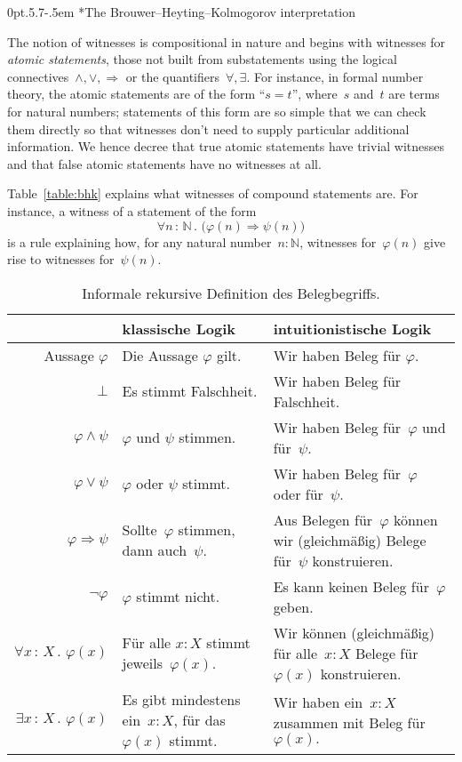 \documentclass[10pt,reqno,a4paper,openany]{amsbook}
\makeatletter
\theoremstyle{definition}
\theoremstyle{plain}
\theoremstyle{remark}
\newcommand{\NN}{\mathbb{N}}
\newcommand{\?}{\,{:}\,}
\renewcommand{\_}{\mathpunct{.}\,}
\def\subsection{\@startsection{subsection}{2}%
  {0pt}{.5\linespacing\@plus.7\linespacing}{-.5em}%
  {\normalfont\bfseries}}
\makeatother
\begin{document}
\subsection*{The Brouwer--Heyting--Kolmogorov interpretation}

The notion of witnesses is compositional in nature and begins with witnesses for \emph{atomic
statements}, those not built from substatements using the logical
connectives~$\wedge,\vee,\Rightarrow$ or the quantifiers~$\forall,\exists$. For
instance, in formal number theory, the atomic statements are of the form
``$s = t$'',
where~$s$ and~$t$ are terms for natural numbers; statements of this form are so
simple that we can check them directly so that witnesses don't need to supply
particular additional information. We hence decree that true atomic statements
have trivial witnesses and that false atomic statements have no witnesses at
all.

Table~\ref{table:bhk} explains what witnesses of compound statements are. For
instance, a witness of a statement of the form
\[ \forall n \? \NN\_ \bigl(\varphi(n) \Rightarrow \psi(n)\bigr) \]
is a rule explaining how, for any natural number~$n : \NN$, witnesses
for~$\varphi(n)$ give rise to witnesses for~$\psi(n)$.

\begin{table}
  \centering
  \small
  \renewcommand{\arraystretch}{1.3}
  \begin{tabular}{@{}rp{5.9cm}p{6.5cm}@{}}
    \toprule
    & {klassische Logik} & {intuitionistische Logik}
    \\\midrule
    Aussage $\varphi$ & Die Aussage $\varphi$ gilt. & Wir haben Beleg für $\varphi$. \\
    $\bot$ & Es stimmt Falschheit. & Wir haben Beleg für Falschheit. \\
    $\varphi \wedge \psi$ & $\varphi$ und $\psi$ stimmen. & Wir haben Beleg für~$\varphi$ und für~$\psi$. \\
    $\varphi \vee \psi$ & $\varphi$ oder $\psi$ stimmt. & Wir haben Beleg für~$\varphi$ oder für~$\psi$. \\
    $\varphi \Rightarrow \psi$ & Sollte~$\varphi$ stimmen, dann auch~$\psi$. &
    Aus Belegen für~$\varphi$ können wir (gleich\-mä\-ßig) Belege für~$\psi$ konstruieren. \\
    $\neg\varphi$ &
      $\varphi$ stimmt nicht. &
      Es kann keinen Beleg für~$\varphi$ geben. \\
    $\forall x\?X\_ \varphi(x)$ & Für alle $x : X$ stimmt jeweils~$\varphi(x).$ &
      Wir können (gleichmäßig) für alle~$x : X$ Belege für~$\varphi(x)$ konstruieren. \\
    $\exists x\?X\_ \varphi(x)$ & \raggedright Es gibt mindestens ein~$x : X$, für das~$\varphi(x)$
    stimmt. & {\raggedright
      Wir haben ein~$x : X$ zusammen mit Beleg für~$\varphi(x).$} \\
    \bottomrule
  \end{tabular}
  \caption{\label{bhk}Informale rekursive Definition des Belegbegriffs.}
\end{table}
\end{document}
